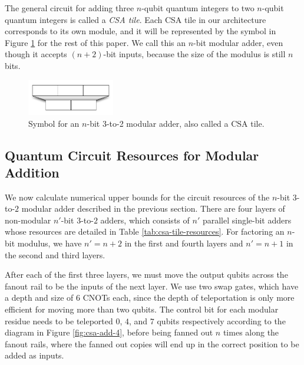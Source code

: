 The general circuit for adding three $n$-qubit quantum integers to
two $n$-qubit quantum integers is called a \emph{CSA tile}. Each CSA tile in our architecture 
corresponds to its own module, and it will be represented by the symbol in 
Figure \ref{fig:csa-tile-symbol} for the rest of this paper. We call this
an $n$-bit modular adder, even though it accepts $(n+2)$-bit inputs, because
the size of the modulus is still $n$ bits.

\begin{center}
\begin{figure}[h!bt]
\centerline{
\includegraphics[width=1.5in]{figures/csa-tile-symbol.pdf}
}
\caption{Symbol for an $n$-bit 3-to-2 modular adder, also called a CSA tile.}
\label{fig:csa-tile-symbol}
\end{figure}
\end{center}


\subsection{Quantum Circuit Resources for Modular Addition}

We now calculate numerical upper bounds for the circuit resources of
the $n$-bit $3$-to-$2$ modular adder described in the previous section.
There are four layers of non-modular $n'$-bit $3$-to-$2$ adders, which
consists of $n'$ parallel single-bit adders whose
resources are detailed in Table \ref{tab:csa-tile-resources}. For factoring
an $n$-bit modulus, we have $n'=n+2$ in the first and fourth layers
and $n'=n+1$ in the second and third layers.

After each of the first three layers, we must move the output qubits
across the fanout rail to be the inputs of the next layer. We use
two swap gates, which have a depth and size of $6$ CNOTs each, since
the depth of teleportation is only more efficient for moving more than
two qubits. The control bit for each modular residue needs to be
teleported $0$, $4$, and $7$ qubits respectively according to the
diagram in Figure \ref{fig:csa-add-4}, before being fanned out $n$
times along the fanout rails, where the fanned out copies will end up
in the correct position to be added as inputs.


